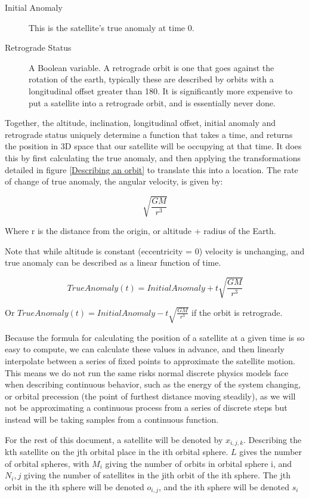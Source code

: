 \documentclass[12pt,a4paper,twoside,openright]{report}
\begin{document}
\begin{description}
\item[Initial Anomaly]
This is the satellite's true anomaly at time 0.
\item[Retrograde Status]
A Boolean variable. A retrograde orbit is one that goes against the rotation of the earth, typically these are described by orbits with a longitudinal offset greater than 180\degree. It is significantly more expensive to put a satellite into a retrograde orbit, and is essentially never done.\cite{Book}
\end{description}

Together, the altitude, inclination, longitudinal offset, initial anomaly and retrograde status uniquely determine a function that takes a time, and returns the position in 3D space that our satellite will be occupying at that time. It does this by first calculating the true anomaly, and then applying the transformations detailed in figure \ref{Describing an orbit} to translate this into a location. The rate of change of true anomaly, the angular velocity, is given by:

\[\sqrt{\frac{GM}{r^3}}\]

Where r is the distance from the origin, or altitude + radius of the Earth.

Note that while altitude is constant (eccentricity = 0) velocity is unchanging, and true anomaly can be described as a linear function of time.

\[TrueAnomaly(t) = InitialAnomaly + t\sqrt{\frac{GM}{r^3}}\]

Or $TrueAnomaly(t) = InitialAnomaly - t\sqrt{\frac{GM}{r^3}}$ if the orbit is retrograde.

Because the formula for calculating the position of a satellite at a given time is so easy to compute, we can calculate these values in advance, and then linearly interpolate between a series of fixed points to approximate the satellite motion. This means we do not run the same risks normal discrete physics models face when describing continuous behavior, such as the energy of the system changing, or orbital precession (the point of furthest distance moving steadily), as we will not be approximating a continuous process from a series of discrete steps but instead will be taking samples from a continuous function.

For the rest of this document, a satellite will be denoted by $x_{i,j,k}$. Describing the kth satellite on the jth orbital place in the ith orbital sphere. $L$ gives the number of orbital spheres, with $M_i$ giving the number of orbits in orbital sphere i, and $N_i,j$ giving the number of satellites in the jith orbit of the ith sphere. The jth orbit in the ith sphere will be denoted $o_{i,j}$, and the ith sphere will be denoted $s_i$
\end{document}
